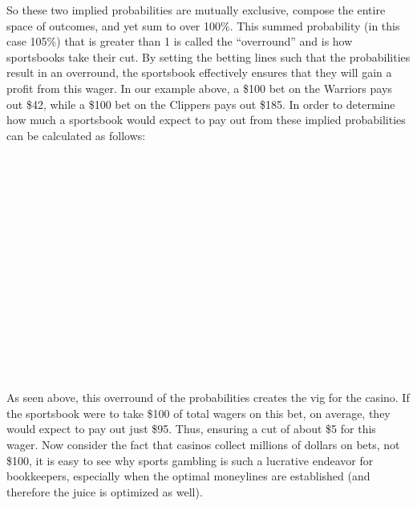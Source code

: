 \documentclass [MS] {uclathes}
\begin{document}
\noindent So these two implied probabilities are mutually exclusive, compose the entire space of outcomes, and yet sum to over 100\%. This summed probability (in this case 105\%) that is greater than 1 is called the ``overround'' and is how sportsbooks take their cut. By setting the betting lines such that the probabilities result in an overround, the sportsbook effectively ensures that they will gain a profit from this wager. In our example above, a \$100 bet on the Warriors pays out \$42, while a \$100 bet on the Clippers pays out \$185. In order to determine how much a sportsbook would expect to pay out from these implied probabilities can be calculated as follows:

\noindent {} \\
\noindent {} \\
\noindent {} \\
\noindent {} \\
\noindent {} \\
\noindent {} \\

\noindent {} \\
\noindent {} \\
\noindent {} \\
\noindent {} \\
\noindent {} \\
\noindent {} \\
\noindent {} \\
\noindent {} \\
\noindent {} \\


\noindent As seen above, this overround of the probabilities creates the vig for the casino. If the sportsbook were to take \$100 of total wagers on this bet, on average, they would expect to pay out just \$95. Thus, ensuring a cut of about \$5 for this wager. Now consider the fact that casinos collect millions of dollars on bets, not \$100, it is easy to see why sports gambling is such a lucrative endeavor for bookkeepers, especially when the optimal moneylines are established (and therefore the juice is optimized as well). \\
\end{document}
